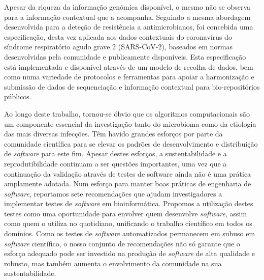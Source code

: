 Apesar da riqueza da informação genómica disponível, o mesmo não se observa para a informação contextual que a acompanha. Seguindo a mesma abordagem desenvolvida para a deteção de resistência a antimicrobianos, foi concebida uma especificação, desta vez aplicada aos dados contextuais do coronavírus do síndrome respiratório agudo grave 2 (SARS-CoV-2), baseados em normas desenvolvidas pela comunidade e publicamente disponíveis. Esta especificação está implementada e disponível através de um modelo de recolha de dados, bem como numa variedade de protocolos e ferramentas para apoiar a harmonização e submissão de dados de sequenciação e informação contextual para bio-repositórios públicos.

Ao longo deste trabalho, tornou-se óbvio que os algoritmos computacionais são um componente essencial da investigação tanto do microbioma como da etiologia das mais diversas infecções. Têm havido grandes esforços por parte da comunidade científica para se elevar os padrões de desenvolvimento e distribuição de \textit{software} para este fim. Apesar destes esforços, a sustentabilidade e a reprodutibilidade continuam a ser questões importantes, uma vez que a continuação da validação através de testes de software ainda não é uma prática amplamente adotada. Num esforço para manter boas práticas de engenharia de \textit{software}, reportamos sete recomendações que ajudam investigadores a implementar testes de \textit{software} em bioinformática. Propomos a utilização destes testes como uma oportunidade para envolver quem desenvolve \textit{software}, assim como quem o utiliza no quotidiano, unificando o trabalho científico em todos os domínios. Como os testes de \textit{software} automatizados permanecem em subuso em \textit{software} científico, o nosso conjunto de recomendações não só garante que o esforço adequado pode ser investido na produção de \textit{software} de alta qualidade e robusto, mas também aumenta o envolvimento da comunidade na sua sustentabilidade.

